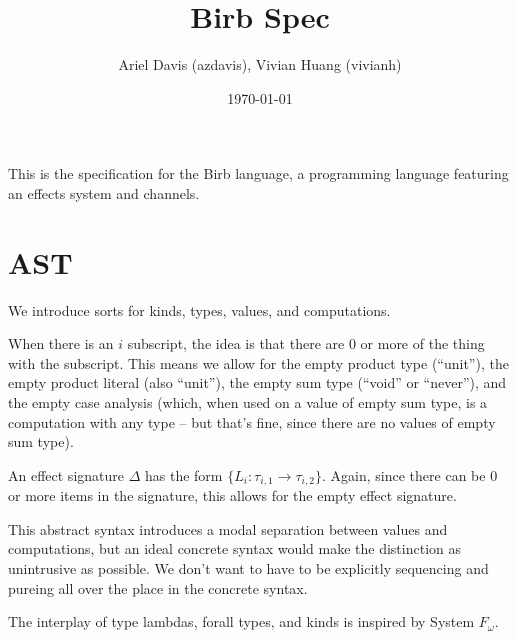 \documentclass[12pt]{article}
\title{Birb Spec}
\author{Ariel Davis (azdavis), Vivian Huang (vivianh)}
\date{\today}
\begin{document}
\maketitle

This is the specification for the Birb language, a programming language
featuring an effects system and channels.

\newpage
\section{AST}

We introduce sorts for kinds, types, values, and computations.

When there is an $i$ subscript, the idea is that there are 0 or more of the
thing with the subscript. This means we allow for the empty product type
(``unit''), the empty product literal (also ``unit''), the empty sum type
(``void'' or ``never''), and the empty case analysis (which, when used on a
value of empty sum type, is a computation with any type -- but that's fine,
since there are no values of empty sum type).

An effect signature $\Delta$ has the form $\{ L_i : \tau_{i,1} \rightarrow
\tau_{i,2} \}$. Again, since there can be 0 or more items in the signature, this
allows for the empty effect signature.

This abstract syntax introduces a modal separation between values and
computations, but an ideal concrete syntax would make the distinction as
unintrusive as possible. We don't want to have to be explicitly sequencing and
\textsf{pure}ing all over the place in the concrete syntax.

The interplay of type lambdas, forall types, and kinds is inspired by System
$F_\omega$.
\end{document}
